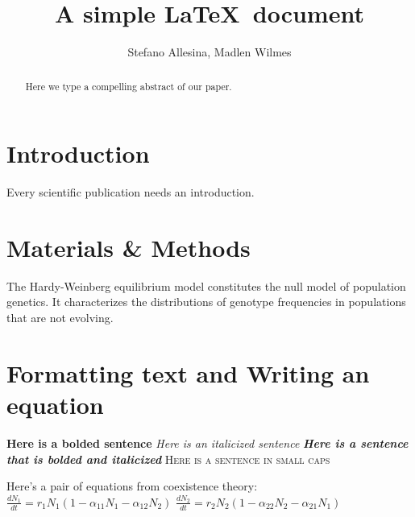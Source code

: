\documentclass[12pt]{article}
\title{A simple \LaTeX\ document}
\author{Stefano Allesina, Madlen Wilmes}
\date{}
\begin{document}
\maketitle
\begin{abstract}
Here we type a compelling abstract of our paper.
\end{abstract}
\section{Introduction}
Every scientific publication needs an introduction.
\section{Materials \& Methods}
The Hardy-Weinberg equilibrium model constitutes the null model of population genetics. It characterizes the distributions of genotype  frequencies in populations that are not evolving.

\section{Formatting text and Writing an equation}

\textbf{Here is a bolded sentence}     
\newline
\textit{Here is an italicized sentence}     
\newline
\textit{\textbf{Here is a sentence that is bolded and italicized}}    
\newline
\textsc{Here is a sentence in small caps}   
\newline

Here's a pair of equations from coexistence theory:
\newline
$\frac{dN_{1}}{dt} = r_{1}N_{1} (1 - \alpha_{11}N_{1} - \alpha_{12}N_{2})$
$\frac{dN_{2}}{dt} = r_{2}N_{2} (1 - \alpha_{22}N_{2} - \alpha_{21}N_{1})$
\end{document}
